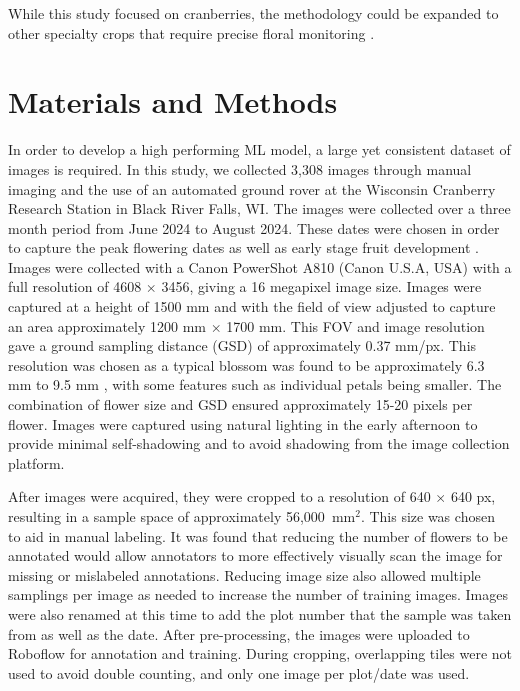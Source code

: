 While this study focused on cranberries, the methodology could be expanded to other specialty crops that require precise floral monitoring \cite{estrada_deep_2024}.

\section{Materials and Methods}

In order to develop a high performing ML model, a large yet consistent dataset of images is required. In this study, we collected 3,308 images through manual imaging and the use of an automated ground rover at the Wisconsin Cranberry Research Station in Black River Falls, WI. The images were collected over a three month period from June 2024 to August 2024. These dates were chosen in order to capture the peak flowering dates as well as early stage fruit development \cite{sandler_cranberry_2008}. Images were collected with a Canon PowerShot A810 (Canon U.S.A, USA) with a full resolution of 4608 $\times$ 3456, giving a 16 megapixel image size. Images were captured at a height of 1500 mm and with the field of view adjusted to capture an area approximately 1200 mm $\times$ 1700 mm. This FOV and image resolution gave a ground sampling distance (GSD) of approximately 0.37 mm/px. This resolution was chosen as a typical blossom was found to be approximately 6.3 mm to 9.5 mm \cite{diaz-garcia_image-based_2018}, with some features such as individual petals being smaller. The combination of flower size and GSD ensured approximately 15-20 pixels per flower. Images were captured using natural lighting in the early afternoon to provide minimal self-shadowing and to avoid shadowing from the image collection platform. 

After images were acquired, they were cropped to a resolution of 640 $\times$ 640 px, resulting in a sample space of approximately 56,000~\(\text{mm}^2\). This size was chosen to aid in manual labeling. It was found that reducing the number of flowers to be annotated would allow annotators to more effectively visually scan the image for missing or mislabeled annotations. Reducing image size also allowed multiple samplings per image as needed to increase the number of training images. Images were also renamed at this time to add the plot number that the sample was taken from as well as the date. After pre-processing, the images were uploaded to Roboflow for annotation and training. During cropping, overlapping tiles were not used to avoid double counting, and only one image per plot/date was used.

